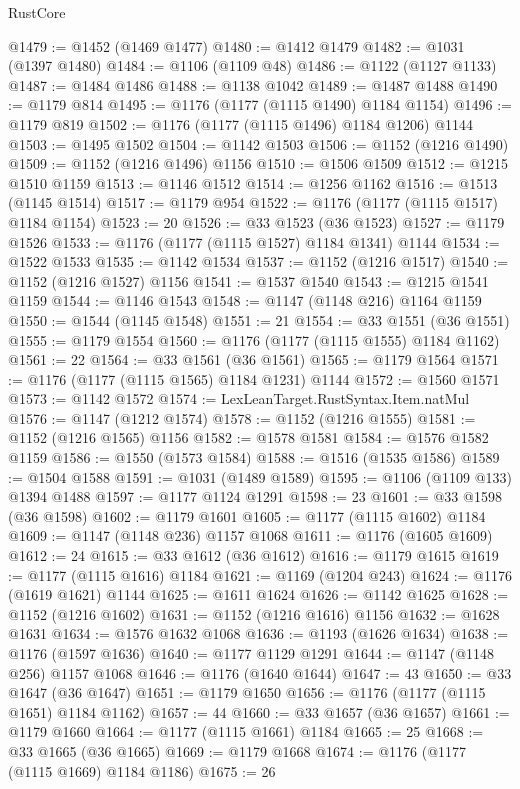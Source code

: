 \begin{lexlean}{RustCore}
\begin{coremodule}
@1479 := @1452 (@1469 @1477)
@1480 := @1412 @1479
@1482 := @1031 (@1397 @1480)
@1484 := @1106 (@1109 @48)
@1486 := @1122 (@1127 @1133)
@1487 := @1484 @1486
@1488 := @1138 @1042
@1489 := @1487 @1488
@1490 := @1179 @814
@1495 := @1176 (@1177 (@1115 @1490) @1184 @1154)
@1496 := @1179 @819
@1502 := @1176 (@1177 (@1115 @1496) @1184 @1206) @1144
@1503 := @1495 @1502
@1504 := @1142 @1503
@1506 := @1152 (@1216 @1490)
@1509 := @1152 (@1216 @1496) @1156
@1510 := @1506 @1509
@1512 := @1215 @1510 @1159
@1513 := @1146 @1512
@1514 := @1256 @1162
@1516 := @1513 (@1145 @1514)
@1517 := @1179 @954
@1522 := @1176 (@1177 (@1115 @1517) @1184 @1154)
@1523 := 20
@1526 := @33 @1523 (@36 @1523)
@1527 := @1179 @1526
@1533 := @1176 (@1177 (@1115 @1527) @1184 @1341) @1144
@1534 := @1522 @1533
@1535 := @1142 @1534
@1537 := @1152 (@1216 @1517)
@1540 := @1152 (@1216 @1527) @1156
@1541 := @1537 @1540
@1543 := @1215 @1541 @1159
@1544 := @1146 @1543
@1548 := @1147 (@1148 @216) @1164 @1159
@1550 := @1544 (@1145 @1548)
@1551 := 21
@1554 := @33 @1551 (@36 @1551)
@1555 := @1179 @1554
@1560 := @1176 (@1177 (@1115 @1555) @1184 @1162)
@1561 := 22
@1564 := @33 @1561 (@36 @1561)
@1565 := @1179 @1564
@1571 := @1176 (@1177 (@1115 @1565) @1184 @1231) @1144
@1572 := @1560 @1571
@1573 := @1142 @1572
@1574 := LexLeanTarget.RustSyntax.Item.natMul
@1576 := @1147 (@1212 @1574)
@1578 := @1152 (@1216 @1555)
@1581 := @1152 (@1216 @1565) @1156
@1582 := @1578 @1581
@1584 := @1576 @1582 @1159
@1586 := @1550 (@1573 @1584)
@1588 := @1516 (@1535 @1586)
@1589 := @1504 @1588
@1591 := @1031 (@1489 @1589)
@1595 := @1106 (@1109 @133) @1394 @1488
@1597 := @1177 @1124 @1291
@1598 := 23
@1601 := @33 @1598 (@36 @1598)
@1602 := @1179 @1601
@1605 := @1177 (@1115 @1602) @1184
@1609 := @1147 (@1148 @236) @1157 @1068
@1611 := @1176 (@1605 @1609)
@1612 := 24
@1615 := @33 @1612 (@36 @1612)
@1616 := @1179 @1615
@1619 := @1177 (@1115 @1616) @1184
@1621 := @1169 (@1204 @243)
@1624 := @1176 (@1619 @1621) @1144
@1625 := @1611 @1624
@1626 := @1142 @1625
@1628 := @1152 (@1216 @1602)
@1631 := @1152 (@1216 @1616) @1156
@1632 := @1628 @1631
@1634 := @1576 @1632 @1068
@1636 := @1193 (@1626 @1634)
@1638 := @1176 (@1597 @1636)
@1640 := @1177 @1129 @1291
@1644 := @1147 (@1148 @256) @1157 @1068
@1646 := @1176 (@1640 @1644)
@1647 := 43
@1650 := @33 @1647 (@36 @1647)
@1651 := @1179 @1650
@1656 := @1176 (@1177 (@1115 @1651) @1184 @1162)
@1657 := 44
@1660 := @33 @1657 (@36 @1657)
@1661 := @1179 @1660
@1664 := @1177 (@1115 @1661) @1184
@1665 := 25
@1668 := @33 @1665 (@36 @1665)
@1669 := @1179 @1668
@1674 := @1176 (@1177 (@1115 @1669) @1184 @1186)
@1675 := 26

\end{coremodule}
\end{lexlean}
